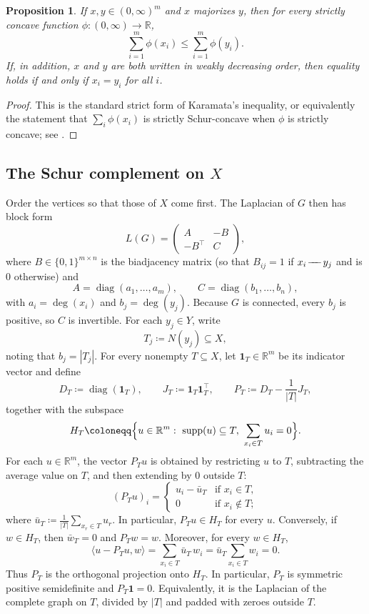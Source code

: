 \documentclass[twoside, reqno]{amsart}
\def\adj{\mathrel{\!\mathrel-\mkern-8mu\mathrel-\mkern-8mu\mathrel-\!}}
\newtheorem{proposition}[theorem]{Proposition}
\theoremstyle{definition}
\theoremstyle{remark}
\newcommand{\RR}{\mathbb R}
\newcommand{\diag}{\operatorname{diag}}
\begin{document}
\begin{proposition}\label{prop:strict-schur}
If $x,y\in(0,\infty)^m$ and $x$ majorizes $y$, then for every strictly 
concave function $\phi\colon(0,\infty)\to\RR$,
\[
\sum_{i=1}^m \phi(x_i)\le \sum_{i=1}^m \phi(y_i).
\]
If, in addition, $x$ and $y$ are both written in weakly decreasing order, 
then equality holds if and only if $x_i=y_i$ for all $i$.
\end{proposition}

\begin{proof}
This is the standard strict form of Karamata's inequality, or equivalently the 
statement that $\sum_i \phi(x_i)$ is strictly Schur-concave when $\phi$ is 
strictly concave; see \cite[Section 3C]{MarshallOlkinArnold}.
\end{proof}

\subsection*{\texorpdfstring{The Schur complement on $X$}{The Schur complement on X}}
Order the vertices so that those of $X$ come first. 
The Laplacian of $G$ then has block form
\[
L(G)=
\begin{pmatrix}
A & -B\\
-B^\top & C
\end{pmatrix},
\]
where $B\in\{0,1\}^{m\times n}$ is the biadjacency matrix 
(so that $B_{ij}=1$ if $x_i\adj y_j$ and is $0$ otherwise) and
\[
A=\diag(a_1,\dots,a_m),\qquad C=\diag(b_1,\dots,b_n),
\]
with $a_i=\deg(x_i)$ and $b_j=\deg(y_j)$. 
Because $G$ is connected, every $b_j$ is positive, so $C$ is invertible. 
For each $y_j\in Y$, write
\[
T_j\coloneqq N(y_j)\subseteq X,\]
noting that $b_j=|T_j|$. For every nonempty $T\subseteq X$, 
let $\mathbf1_T\in\RR^m$ be its indicator vector and define
\[
D_T\coloneqq \diag(\mathbf1_T),\qquad 
J_T\coloneqq \mathbf1_T\mathbf1_T^{\top},\qquad 
P_T\coloneqq D_T-\frac{1}{|T|}J_T,
\]
together with the subspace
\[
H_T\coloneqq 
\Bigl\{u\in\RR^m:
\ \operatorname{supp}(u)\subseteq T,\ \sum_{x_i\in T}u_i=0\Bigr\}.
\]
For each $u\in\RR^m$, the vector $P_Tu$ is obtained by restricting $u$ to $T$, subtracting the average value on $T$, and then extending by $0$ outside $T$:
\[
(P_Tu)_i=
\begin{cases}
u_i-\bar u_T& \text{if } x_i\in T,\\ 
0& \text{if } x_i\notin T;
\end{cases}
\]
where $\bar u_T\coloneqq \frac{1}{|T|}\sum_{x_r\in T}u_r$. 
In particular, $P_Tu\in H_T$ for every $u$. Conversely, if $w\in H_T$, 
then $\bar w_T=0$ and $P_Tw=w$. Moreover, for every $w\in H_T$,
\[
\langle u-P_Tu,w\rangle
=
\sum_{x_i\in T}\bar u_T\,w_i
=
\bar u_T\sum_{x_i\in T}w_i
=
0.
\]
Thus $P_T$ is the orthogonal projection onto $H_T$. 
In particular, $P_T$ is symmetric positive semidefinite and 
$P_T\mathbf1=0$. Equivalently, it is the Laplacian of the complete graph 
on $T$, divided by $|T|$ and padded with zeroes outside $T$.
\end{document}

